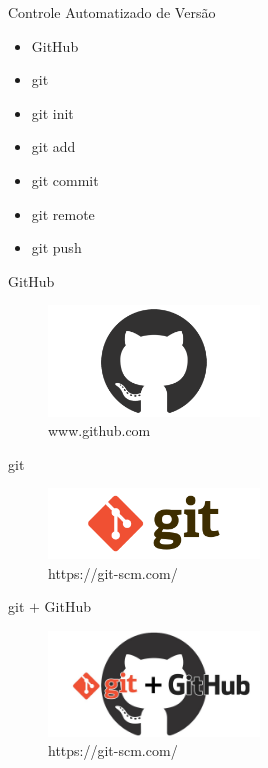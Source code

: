 \begin{frame}{Controle Automatizado de Versão}
	\begin{itemize}
		\item GitHub
		\item git
		\item git init
		\item git add 
		\item git commit
		\item git remote
		\item git push
	\end{itemize}
\end{frame}
\begin{frame}{GitHub}
    \begin{center}
        \begin{figure}[h]
            \includegraphics[width=0.5\textwidth]{imagens/github.png}
            \caption{www.github.com}
        \end{figure}
	\end{center}
\end{frame}
\begin{frame}{git}
    \begin{center}
        \begin{figure}[h]
            \includegraphics[width=0.5\textwidth]{imagens/git.png}
            \caption{https://git-scm.com/}
        \end{figure}
	\end{center}
\end{frame}
\begin{frame}{git $+$ GitHub}
    \begin{center}
        \begin{figure}[h]
            \includegraphics[width=0.5\textwidth]{imagens/git_github.jpeg}
            \caption{https://git-scm.com/}
        \end{figure}
	\end{center}
\end{frame}